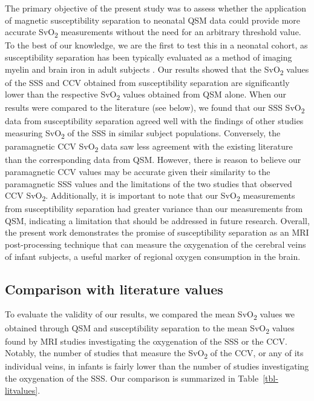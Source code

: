\documentclass[
true
]{sn-jnl}
\begin{document}
The primary objective of the present study was to assess whether the
application of magnetic susceptibility separation to neonatal QSM data
could provide more accurate SvO\textsubscript{2} measurements without
the need for an arbitrary threshold value. To the best of our knowledge,
we are the first to test this in a neonatal cohort, as susceptibility
separation has been typically evaluated as a method of imaging myelin
and brain iron in adult subjects
\citep{shinHseparationMagneticSusceptibility2021, ahmedDiamagneticComponentMap2023a}.
Our results showed that the SvO\textsubscript{2} values of the SSS and
CCV obtained from susceptibility separation are significantly lower than
the respective SvO\textsubscript{2} values obtained from QSM alone. When
our results were compared to the literature (see below), we found that
our SSS SvO\textsubscript{2} data from susceptibility separation agreed
well with the findings of other studies measuring SvO\textsubscript{2}
of the SSS in similar subject populations. Conversely, the paramagnetic
CCV SvO\textsubscript{2} data saw less agreement with the existing
literature than the corresponding data from QSM. However, there is
reason to believe our paramagnetic CCV values may be accurate given
their similarity to the paramagnetic SSS values and the limitations of
the two studies that observed CCV SvO\textsubscript{2}. Additionally, it
is important to note that our SvO\textsubscript{2} measurements from
susceptibility separation had greater variance than our measurements
from QSM, indicating a limitation that should be addressed in future
research. Overall, the present work demonstrates the promise of
susceptibility separation as an MRI post-processing technique that can
measure the oxygenation of the cerebral veins of infant subjects, a
useful marker of regional oxygen consumption in the brain.

\subsection{Comparison with literature
values}\label{comparison-with-literature-values}

To evaluate the validity of our results, we compared the mean
SvO\textsubscript{2} values we obtained through QSM and susceptibility
separation to the mean SvO\textsubscript{2} values found by MRI studies
investigating the oxygenation of the SSS or the CCV. Notably, the number
of studies that measure the SvO\textsubscript{2} of the CCV, or any of
its individual veins, in infants is fairly lower than the number of
studies investigating the oxygenation of the SSS. Our comparison is
summarized in Table~\ref{tbl-litvalues}.
\end{document}
